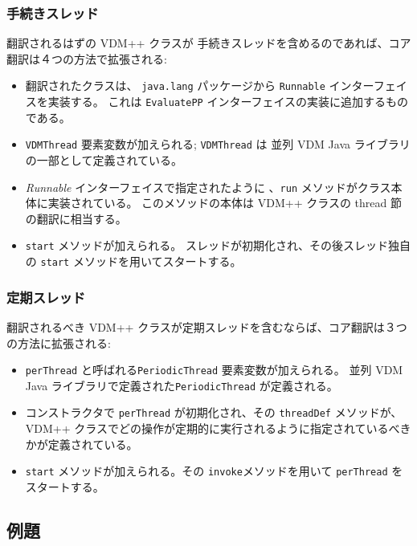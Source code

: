 \documentclass[\pformat,11pt]{jarticle}
\newcommand{\VDM}{VDM++}
\newcommand{\CJL}{並列 VDM Java ライブラリ}
\begin{document}
\subsubsection{手続きスレッド}

翻訳されるはずの \VDM{} クラスが 手続きスレッドを含めるのであれば、コア翻訳は４つの方法で拡張される:
\begin{itemize}
\item 翻訳されたクラスは、 \texttt{java.lang} パッケージから \texttt{Runnable} インターフェイスを実装する。
これは \texttt{EvaluatePP} インターフェイスの実装に追加するものである。
\item  \texttt{VDMThread} 要素変数が加えられる; \texttt{VDMThread} は \CJL の一部として定義されている。
\item  \textit{Runnable} インターフェイスで指定されたように 、\texttt{run} メソッドがクラス本体に実装されている。
このメソッドの本体は  \VDM{} クラスの \textsf{thread} 節の翻訳に相当する。
\item \texttt{start} メソッドが加えられる。
スレッドが初期化され、その後スレッド独自の \texttt{start} メソッドを用いてスタートする。
\end{itemize}

\subsubsection{定期スレッド}
翻訳されるべき \VDM{} クラスが定期スレッドを含むならば、コア翻訳は３つの方法に拡張される:
\begin{itemize}
\item   \texttt{perThread} と呼ばれる\texttt{PeriodicThread} 要素変数が加えられる。 \CJL で定義された\texttt{PeriodicThread} が定義される。
\item コンストラクタで \texttt{perThread} が初期化され、その \texttt{threadDef} メソッドが、 \VDM{} クラスでどの操作が定期的に実行されるように指定されているべきかが定義されている。
\item  \texttt{start} メソッドが加えられる。その \texttt{invoke}メソッドを用いて \texttt{perThread} をスタートする。
\end{itemize}


\subsection{例題}
\end{document}

